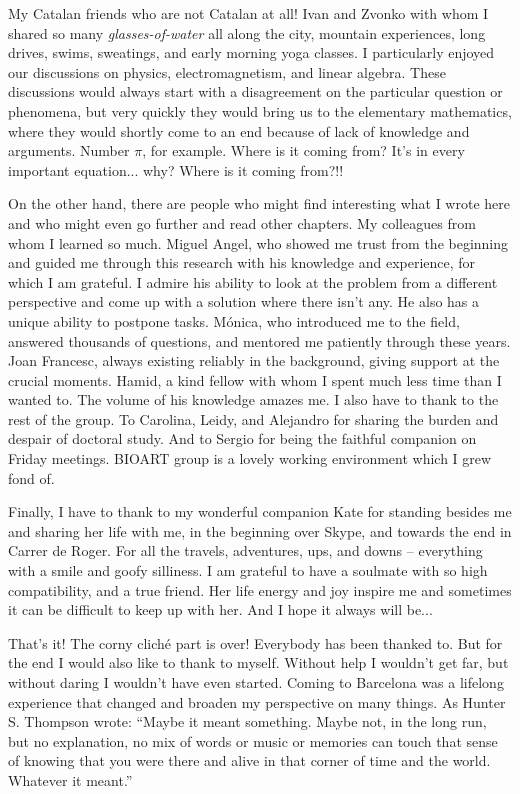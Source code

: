 \documentclass[a4paper,twoside,11pt]{report}
\begin{document}
My Catalan friends who are not Catalan at all! Ivan and Zvonko with whom I shared so many \emph{glasses-of-water} all along the city, mountain experiences, long drives, swims, sweatings, and early morning yoga classes. I particularly enjoyed our discussions on physics, electromagnetism, and linear algebra. These discussions would always start with a disagreement on the particular question or phenomena, but very quickly they would bring us to the elementary mathematics, where they would shortly come to an end because of lack of knowledge and arguments. Number $\pi$, for example. Where is it coming from? It's in every important equation... why? Where is it coming from?!!

On the other hand, there are people who might find interesting what I wrote here and who might even go further and read other chapters. My colleagues from whom I learned so much. Miguel Angel, who showed me trust from the beginning and guided me through this research with his knowledge and experience, for which I am grateful. I admire his ability to look at the problem from a different perspective and come up with a solution where there isn't any. He also has a unique ability to postpone tasks. Mónica, who introduced me to the field, answered thousands of questions, and mentored me patiently through these years. Joan Francesc, always existing reliably in the background, giving support at the crucial moments. Hamid, a kind fellow with whom I spent much less time than I wanted to. The volume of his knowledge amazes me. I also have to thank to the rest of the group. To Carolina, Leidy, and Alejandro for sharing the burden and despair of doctoral study. And to Sergio for being the faithful companion on Friday meetings. BIOART group is a lovely working environment which I grew fond of.

Finally, I have to thank to my wonderful companion Kate for standing besides me and sharing her life with me, in the beginning over Skype, and towards the end in Carrer de Roger. For all the travels, adventures, ups, and downs -- everything with a smile and goofy silliness. I am grateful to have a soulmate with so high compatibility, and a true friend. Her life energy and joy inspire me and sometimes it can be difficult to keep up with her. And I hope it always will be...

That's it! The corny cliché part is over! Everybody has been thanked to. But for the end I would also like to thank to myself. Without help I wouldn't get far, but without daring I wouldn't have even started. Coming to Barcelona was a lifelong experience that changed and broaden my perspective on many things. As Hunter S. Thompson wrote: “Maybe it meant something. Maybe not, in the long run, but no explanation, no mix of words or music or memories can touch that sense of knowing that you were there and alive in that corner of time and the world. Whatever it meant.”
\end{document}
